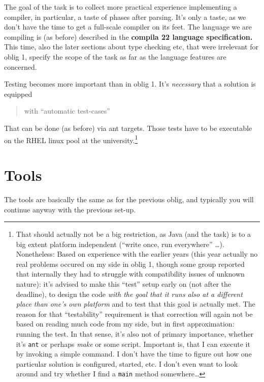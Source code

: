 \documentclass[11pt,freeform]{handout}[2014/08/13]
\begin{document}
The goal of the task is to collect more practical experience implementing a
compiler, in particular, a taste of phases after parsing. It's only a
taste, as we don't have the time to get a full-scale compiler on its
feet. The language we are compiling is (as before) described in the
\textbf{compila 22 language specification.} This time, also the later
sections about type checking etc, that were irrelevant for oblig 1, specify
the scope of the task as far as the language features are concerned.


Testing becomes more important than in oblig 1. It's \emph{necessary} that
a solution is equipped


\begin{quote}
  with ``automatic test-cases''
\end{quote}

That can be done (as before) via ant targets. Those tests have to be
executable on the RHEL linux pool at the university.\footnote{That should
  actually not be a big restriction, as Java (and the task) is to a big
  extent platform independent (``write once, run everywhere''
  \ldots). Nonetheless: Based on experience with the earlier years (this
  year actually no real problems occured on my side in oblig 1, though some
  group reported that internally they had to struggle with compatibility
  issues of unknown nature): it's advised to make this ``test'' setup early
  on (not after the deadline), to design the code \emph{with the goal that
    it runs also at a different place than one's own platform} and to test
  that this goal is actually met. The reason for that ``testability''
  requirement is that correction will again not be based on reading much
  code from my side, but in first approximation: running the test. In that
  sense, it's also not of primary importance, whether it's \texttt{ant} or
  perhaps \emph{make} or some script. Important is, that I can execute it
  by invoking a simple command.  I don't have the time to figure out how
  one particular solution is configured, started, etc. I don't even want to
  look around and try whether I find a \texttt{main} method somewhere\ldots
}


\section{Tools}


The tools are basically the same as for the previous oblig, and typically
you will continue anyway with the previous set-up. 
\end{document}
